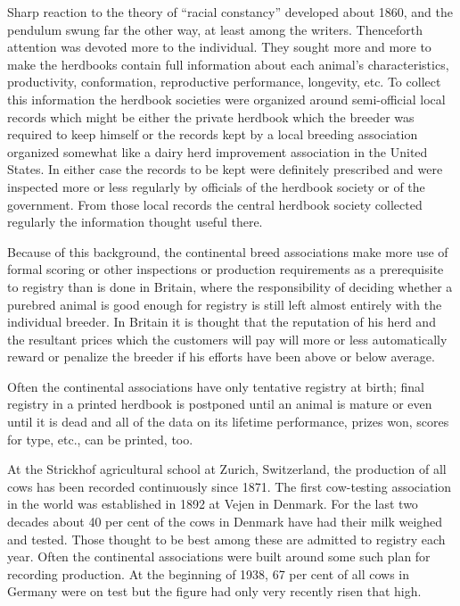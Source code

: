 Sharp reaction to the theory of ``racial constancy'' developed about 1860, and the pendulum swung far the other way, at 
least among the writers. Thenceforth attention was devoted more to the individual. They sought more and more to make the 
herdbooks contain full information about each animal's characteristics, productivity, conformation, reproductive 
performance, longevity, etc. To collect this information the herdbook societies were organized around semi-official local 
records which might be either the private herdbook which the breeder was required to keep himself or the records kept by a 
local breeding association organized somewhat like a dairy herd improvement association in the United States. In either 
case the records to be kept were definitely prescribed and were inspected more or less regularly by officials of the 
herdbook society or of the government. From those local records the central herdbook society collected regularly the 
information thought useful there. 

Because of this background, the continental breed associations make more use of formal scoring or other inspections or 
production requirements as a prerequisite to registry than is done in Britain, where the responsibility of deciding whether 
a purebred animal is good enough for registry is still left almost entirely with the individual breeder. In Britain it is 
thought that the reputation of his herd and the resultant prices which the customers will pay will more or less automatically 
reward or penalize the breeder if his efforts have been above or below average. 

Often the continental associations have only tentative registry at birth; final registry in a printed herdbook is postponed 
until an animal is mature or even until it is dead and all of the data on its lifetime performance, prizes won, scores for 
type, etc., can be printed, too.

At the Strickhof agricultural school at Zurich, Switzerland, the production of all cows has been recorded continuously 
since 1871. The first cow-testing association in the world was established in 1892 at Vejen in Denmark. For the last two 
decades about 40 per cent of the cows in Denmark have had their milk weighed and tested. Those thought to be best among 
these are admitted to registry each year. Often the continental associations were built around some such plan for recording 
production. At the beginning of 1938, 67 per cent of all cows in Germany were on test but the figure had only very recently 
risen that high. 

